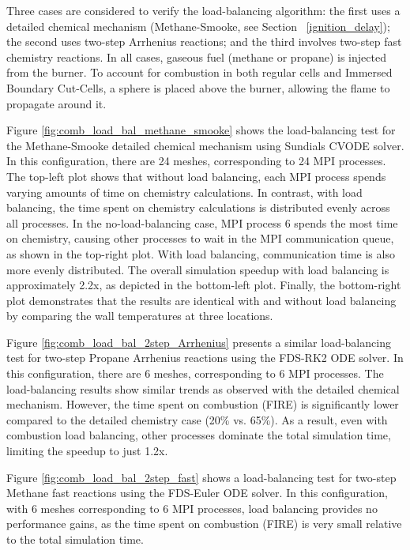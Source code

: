 \documentclass[11pt]{book}
\begin{document}
Three cases are considered to verify the load-balancing algorithm: the first uses a detailed chemical mechanism (Methane-Smooke, see Section ~\ref{ignition_delay}); the second uses two-step Arrhenius reactions; and the third involves two-step fast chemistry reactions. In all cases, gaseous fuel (methane or propane) is injected from the burner. To account for combustion in both regular cells and Immersed Boundary Cut-Cells, a sphere is placed above the burner, allowing the flame to propagate around it.


Figure \ref{fig:comb_load_bal_methane_smooke} shows the load-balancing test for the Methane-Smooke detailed chemical mechanism using Sundials CVODE solver. In this configuration, there are 24 meshes, corresponding to 24 MPI processes. The top-left plot shows that without load balancing, each MPI process spends varying amounts of time on chemistry calculations. In contrast, with load balancing, the time spent on chemistry calculations is distributed evenly across all processes. In the no-load-balancing case, MPI process 6 spends the most time on chemistry, causing other processes to wait in the MPI communication queue, as shown in the top-right plot. With load balancing, communication time is also more evenly distributed. The overall simulation speedup with load balancing is approximately 2.2x, as depicted in the bottom-left plot. Finally, the bottom-right plot demonstrates that the results are identical with and without load balancing by comparing the wall temperatures at three locations.

Figure \ref{fig:comb_load_bal_2step_Arrhenius} presents a similar load-balancing test for two-step Propane Arrhenius reactions using the FDS-RK2 ODE solver. In this configuration, there are 6 meshes, corresponding to 6 MPI processes. The load-balancing results show similar trends as observed with the detailed chemical mechanism. However, the time spent on combustion (FIRE) is significantly lower compared to the detailed chemistry case (20\% vs. 65\%). As a result, even with combustion load balancing, other processes dominate the total simulation time, limiting the speedup to just 1.2x.

Figure \ref{fig:comb_load_bal_2step_fast} shows a load-balancing test for two-step Methane fast reactions using the FDS-Euler ODE solver. In this configuration, with 6 meshes corresponding to 6 MPI processes, load balancing provides no performance gains, as the time spent on combustion (FIRE) is very small relative to the total simulation time.
\end{document}
